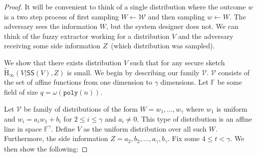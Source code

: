 \documentclass[11pt]{article}
\newcommand{\class}[1]{{\ensuremath{\mathsf{#1}}}}
\newcommand{\sketch}{\ensuremath{\class{SS}}\xspace}
\newcommand{\poly}{\ensuremath{\mathtt{poly}}\xspace}
\newcommand{\Hav}{\tilde{\mathrm{H}}_\infty}
\begin{document}
\begin{proof}
It will be convenient to think of a single distribution where the outcome $w$ is a two step process of first sampling $W\leftarrow \mathcal{W}$ and then sampling $w\leftarrow W$.  The adversary sees the information $W$, but the system designer does not.  We can think of the fuzzy extractor working for a distribution $V$ and the adversary receiving some side information $Z$~(which distribution was sampled).  

We show that there exists distribution $V$ such that for any secure sketch $\Hav(V | \sketch(V), Z)$ is small.  We begin by describing our family $\mathcal{V}$.  $\mathcal{V}$ consists of the set of affine functions from one dimension to $\gamma$ dimensions.  %
Let $\mathbb{F}$ be some field of size $q =\omega(\poly(n))$.  

Let $\mathcal{V}$ be family of distributions of the form $W = w_1,..., w_\gamma$ where $w_1$ is uniform and $w_i = a_i w_1 + b_i$ for $2\le i \le \gamma$ and $a_i\neq 0$.  This type of distribution is an affine line in space $\mathbb{F}^\gamma$.  Define $V$ as the uniform distribution over all such $W$.  Furthermore, the side information $Z = a_2, b_2, ..., a_\gamma, b_\gamma$. Fix some $4\le t < \gamma$.
We then show the following:


\end{proof}
\end{document}
